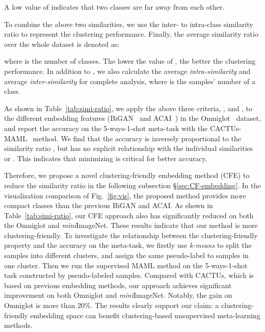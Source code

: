 \documentclass[runningheads]{llncs}
\begin{document}
A low value of  indicates that two classes are far away from each other. 

To combine the above two similarities, we use the inter- to intra-class similarity ratio  to represent the clustering performance. Finally, the average similarity ratio  over the whole dataset is denoted as:

where  is the number of classes. The lower the value of , the better the clustering performance. In addition to , we also calculate the average \textit{intra-similarity}  and average \textit{inter-similarity}  for complete analysis, where  is the samples’ number of a class.

As shown in Table~\ref{tab:simi-ratio}, we apply the above three criteria, ,  and , to the different embedding features (BiGAN~\cite{donahue2016adversarial} and ACAI~\cite{berthelot2018understanding}) in the Omniglot~\cite{lake2011one} dataset, and report the accuracy on the 5-ways-1-shot meta-task with the CACTUs-MAML~\cite{hsu2018unsupervised} method. We find that the accuracy is inversely proportional to the similarity ratio , but has no explicit relationship with the individual similarities  or . This indicates that minimizing  is critical for better accuracy. 



Therefore, we propose a novel clustering-friendly embedding method (CFE) to reduce the similarity ratio in the following subsection \S\ref{sec:CF-embedding}. In the visualization comparison of Fig.~\ref{fig:vis}, the proposed method provides more compact classes than the previous BiGAN and ACAI. As shown in Table~\ref{tab:simi-ratio}, our CFE approach also has significantly reduced  on both the Omniglot and \textit{mini}ImageNet. These results indicate that our method is more clustering-friendly. To investigate the relationship between the clustering-friendly property and the accuracy on the meta-task, 
we firstly use {\it k-means} to split the samples into different clusters,
and assign the same pseudo-label to samples in one cluster. Then we run the supervised MAML method on the 5-ways-1-shot task constructed by pseudo-labeled samples.
Compared with CACTUs, which is based on previous embedding methods, our approach achieves significant improvement on both Omniglot and \textit{mini}ImageNet. Notably, the gain on Omniglot is more than 20\%. The results clearly support our claim: a clustering-friendly embedding space can benefit clustering-based unsupervised meta-learning methods. 
\end{document}
